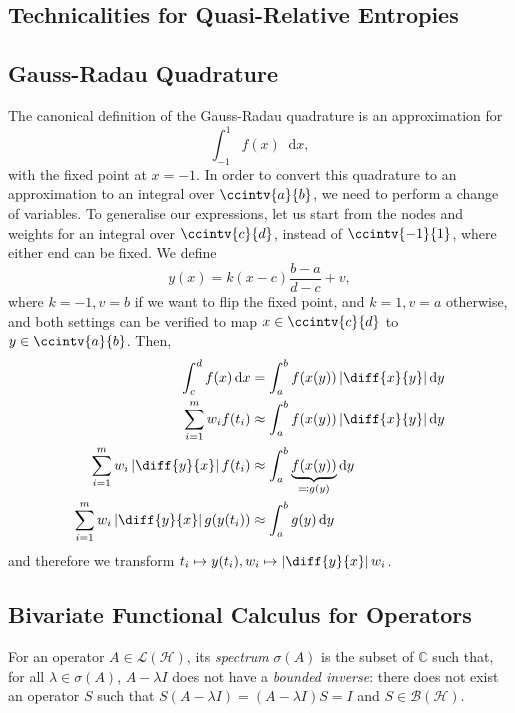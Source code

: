 \documentclass[10pt, a4paper]{article}
\numberwithin{equation}{section} %
\theoremstyle{definition}
\theoremstyle{plain}
\newcommand{\abs}[1]{\left\lvert#1\right\rvert}
\newcommand{\dif}{\mathop{}\!\mathrm{d}} %
\newcommand{\?}{\mathrel{?}} %
\newcommand{\C}{\mathbb{C}} %
\newcommand{\Hs}{\mathcal{H}} %
\begin{document}
    \begin{appendices}
      \section{Technicalities for Quasi-Relative Entropies}\label{sec:qretech}

      \subsection{Gauss-Radau Quadrature}\label{sec:qretech_grq}

      The canonical definition of the Gauss-Radau quadrature is an approximation for
      \[ \int_{-1}^{1} f(x) \dif{x}, \]
      with the fixed point at \(x = -1\). In order to convert this quadrature to an approximation to an integral over \(\ccintv{a}{b}\), we need to perform a change of variables. To generalise our expressions, let us start from the nodes and weights for an integral over \(\ccintv{c}{d}\), instead of \(\ccintv{-1}{1}\), where either end can be fixed. We define
      \[ y(x) = k(x - c)\frac{b - a}{d - c} + v, \]
      where \(k = -1, v = b\) if we want to flip the fixed point, and \(k = 1, v = a\) otherwise, and both settings can be verified to map \(x\in\ccintv{c}{d}\) to \(y\in\ccintv{a}{b}\). Then,
      \begin{align*}
        \int_{c}^{d} f(x) \dif{x} &= \int_{a}^{b} f(x(y)) \abs{\diff{x}{y}} \dif{y} \\
        \sum_{i=1}^m w_i f(t_i) &\approx \int_{a}^{b} f(x(y)) \abs{\diff{x}{y}} \dif{y} \\
        \sum_{i=1}^m w_i \abs{\diff{y}{x}} f(t_i) &\approx \int_{a}^{b} \underbrace{f(x(y))}_{\eqqcolon g(y)} \dif{y} \\
        \sum_{i=1}^m w_i \abs{\diff{y}{x}} g(y(t_i)) &\approx \int_{a}^{b} g(y) \dif{y}
      \end{align*}
      and therefore we transform \(t_i \mapsto y(t_i), w_i \mapsto \abs{\diff{y}{x}} w_i\).

      \subsection{Bivariate Functional Calculus for Operators}

      For an operator \(A \in \mathcal{L}(\Hs)\), its \emph{spectrum} \(\sigma(A)\) is the subset of \(\C\) such that, for all \(\lambda \in \sigma(A)\), \(A - \lambda I\) does not have a \emph{bounded inverse}: there does not exist an operator \(S\) such that \(S\left( A - \lambda I \right) = \left( A - \lambda I \right)S =  I\) and \(S \in \mathcal{B}(\Hs)\).


\end{appendices}
\end{document}
